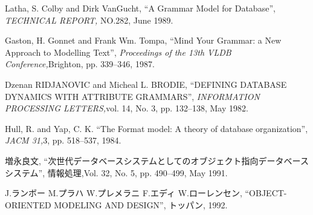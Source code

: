 \thispagestyle{myheadings}
    
\begin{thebibliography}{参考文献}

Latha, S. Colby and Dirk VanGucht,
``A Grammar Model for Database'',
{\it TECHNICAL REPORT,} NO.282,
June 1989.

Gaston, H. Gonnet and Frank Wm. Tompa,
``Mind Your Grammar: a New Approach to Modelling Text'',
{\it Proceedings of the 13th VLDB Conference,}Brighton,
pp. 339--346, 1987.

Dzenan RIDJANOVIC and Micheal L. BRODIE,
``DEFINING DATABASE DYNAMICS WITH ATTRIBUTE GRAMMARS'',
{\it INFORMATION PROCESSING LETTERS,}vol. 14, No. 3,
pp. 132--138, May 1982.


%
%
%
%
%
%
%

Hull, R. and Yap, C. K.
``The Format model: A theory of database organization'',
{\it JACM 31,}3,
pp. 518--537, 1984.

増永良文,
``次世代データベースシステムとしてのオブジェクト指向データベースシステム'',
情報処理,Vol. 32, No. 5,
pp. 490--499, May 1991.


J.ランボー M.プラハ W.プレメラニ F.エディ W.ローレンセン,
``OBJECT-ORIENTED MODELING AND DESIGN'',
トッパン, 1992.



\end{thebibliography}
